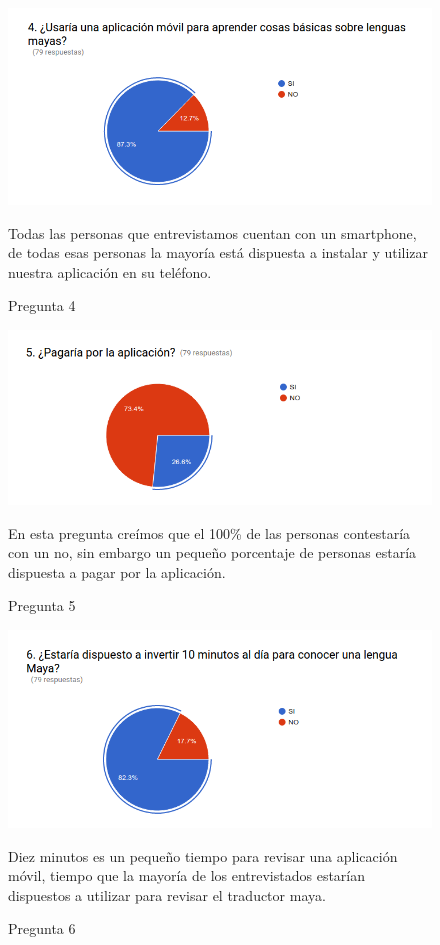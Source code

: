 \documentclass[a4paper,openright,11pt]{article}
\begin{document}
\begin{figure}
	\centering
	\includegraphics[width=1.0\textwidth]{e4}
	\caption{Pregunta 4}
	\label{fig:e4}
	Todas las personas que entrevistamos cuentan con un smartphone, de todas esas personas la mayoría está dispuesta a instalar y utilizar nuestra aplicación en su teléfono.
\end{figure}
\begin{figure}
	\centering
	\includegraphics[width=1.0\textwidth]{e5}
	\caption{Pregunta 5}
	\label{fig:e5}
	En esta pregunta creímos que el 100\% de las personas contestaría con un no, sin embargo un pequeño porcentaje de personas estaría dispuesta a pagar por la aplicación.
\end{figure}
\begin{figure}
	\centering
	\includegraphics[width=1.0\textwidth]{e6}
	\caption{Pregunta 6}
	\label{fig:e6}
	Diez minutos es un pequeño tiempo para revisar una aplicación móvil, tiempo que la mayoría de los entrevistados estarían dispuestos a utilizar para revisar el traductor maya.
\end{figure}
\end{document}
